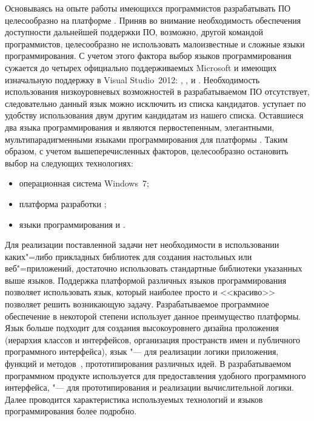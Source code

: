 Основываясь на опыте работы имеющихся программистов разрабатывать ПО целесообразно на платформе \dotnet{}.
Приняв во внимание необходимость обеспечения доступности дальнейшей поддержки ПО, возможно, другой командой программистов, целесообразно не использовать малоизвестные и сложные языки программирования.
С учетом этого фактора выбор языков программирования сужается до четырех официально поддерживаемых Microsoft и имеющих изначальную поддержку в Visual Studio~2012: \cppcli{}, \csharp{}, \vbnet{} и \fsharp{}.
Необходимость использования низкоуровневых возможностей \cppcli{} в разрабатываемом ПО отсутствует, следовательно данный язык можно исключить из списка кандидатов.
\vbnet{} уступает по удобству использования двум другим кандидатам из нашего списка.
Оставшиеся два языка программирования \csharp{} и \fsharp{} являются первостепенным, элегантными, мультипарадигменными языками программирования для платформы \dotnet.
Таким образом, с учетом вышеперечисленных факторов, целесообразно остановить выбор на следующих технологиях:
\begin{itemize}
  \item операционная система Windows~7;
  \item платформа разработки \dotnet{};
  \item языки программирования \csharp{} и \fsharp{}.
\end{itemize}
Для реализации поставленной задачи нет необходимости в использовании каких"=либо прикладных библиотек для создания настольных или веб"=приложений, достаточно использовать стандартные библиотеки указанных выше языков.
Поддержка платформой \dotnet{} различных языков программирования позволяет использовать язык, который наиболее просто и <<красиво>> позволяет решить возникающую задачу.
Разрабатываемое программное обеспечение в некоторой степени использует данное преимущество платформы.
Язык \csharp{} больше подходит для создания высокоуровнего дизайна проложения (иерархия классов и интерфейсов, организация пространств имен и публичного программного интерфейса), язык \fsharp{} "--- для реализации логики приложения, функций и методов~\cite{fsdg_2010}, прототипирования различных идей.
В разрабатываемом программном продукте \csharp{} используется для предоставления удобного программного интерфейса, \fsharp{} "--- для прототипирования и реализации вычислительной логики.
Далее проводится характеристика используемых технологий и языков программирования более подробно.

